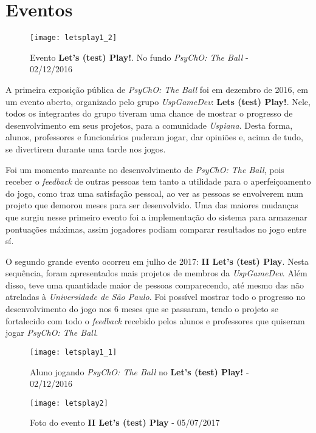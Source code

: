 \section{Eventos}
\label{sec:eventos}


\begin{figure}[h]
\texttt{[image: letsplay1\_2]}
\centering
\caption{Evento \textbf{Let's (test) Play!}. No fundo \textit{PsyChO: The Ball} - 02/12/2016}
\end{figure}

A primeira exposição pública de \textit{PsyChO: The Ball} foi em dezembro de 2016, em um evento aberto, organizado pelo grupo \textit{UspGameDev}: \textbf{Lets (test) Play!}. Nele, todos os integrantes do grupo tiveram uma chance de mostrar o progresso de desenvolvimento em seus projetos, para a comunidade \textit{Uspiana}. Desta forma, alunos, professores e funcionários puderam jogar, dar opiniões e, acima de tudo, se divertirem durante uma tarde nos jogos.

Foi um momento marcante no desenvolvimento de \textit{PsyChO: The Ball}, pois receber o \textit{feedback} de outras pessoas tem tanto a utilidade para o aperfeiçoamento do jogo, como traz uma satisfação pessoal, ao ver as pessoas se envolverem num projeto que demorou meses para ser desenvolvido. Uma das maiores mudanças que surgiu nesse primeiro evento foi a implementação do sistema para armazenar pontuações máximas, assim jogadores podiam comparar resultados no jogo entre sí.

O segundo grande evento ocorreu em julho de 2017: \textbf{II Let's (test) Play}. Nesta sequência, foram apresentados mais projetos de membros da \textit{UspGameDev}. Além disso, teve uma quantidade maior de pessoas comparecendo, até mesmo das não atreladas à \textit{Universidade de São Paulo}. Foi possível mostrar todo o progresso no desenvolvimento do jogo nos 6 meses que se passaram, tendo o projeto se fortalecido com todo o \textit{feedback} recebido pelos alunos e professores que quiseram jogar \textit{PsyChO: The Ball}.

\begin{figure}[h!]
  \texttt{[image: letsplay1\_1]}
  \centering
  \caption{Aluno jogando \textit{PsyChO: The Ball} no \textbf{Let's (test) Play!} - 02/12/2016}
\end{figure}

\begin{figure}[h]
\texttt{[image: letsplay2]}
\centering
\caption{Foto do evento \textbf{II Let's (test) Play} - 05/07/2017}
\end{figure}

